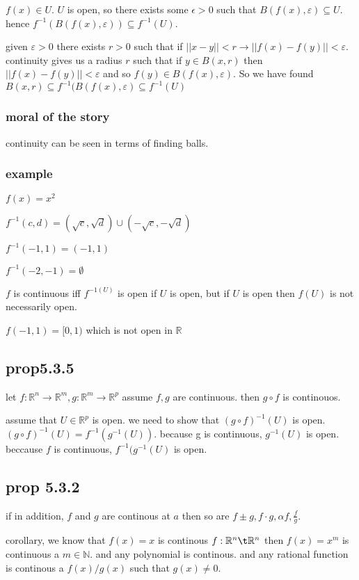 \documentclass[letterpaper]{article}
\begin{document}
$f(x)\in U$. $U$ is open, so there exists some $\epsilon>0$ such that $B(f(x),\varepsilon)\subseteq U$. hence $f^{-1}(B(f(x),\varepsilon))\subseteq f^{-1}(U)$.

given $\varepsilon>0$ there exists $r>0$ such that if $||x-y||<r\to ||f(x)-f(y)||<\varepsilon$. continuity gives us a radius $r$ such that if $y\in B(x,r)$ then $||f(x)-f(y)||<\varepsilon$ and so $f(y)\in B(f(x),\varepsilon)$. So we have found $B(x,r)\subseteq f^{-1}(B(f(x),\varepsilon)\subseteq f^{-1}(U)$

\subsubsection*{moral of the story}
continuity can be seen in terms of finding balls.

\subsubsection*{example}
$f(x)=x^2$

$f^{-1}(c,d)=(\sqrt{c},\sqrt{d})\cup (-\sqrt{c},-\sqrt{d})$

$f^{-1}(-1,1)=(-1,1)$

$f^{-1}(-2,-1)=\emptyset$

$f$ is continuous iff $f^{-1(U)}$ is open if $U$ is open, but if $U$ is open then $f(U)$ is not necessarily open.

$f(-1,1)=[0,1)$ which is not open in $\mathbb{R}$

\subsection*{prop5.3.5}
let $f:\mathbb{R}^n\to\mathbb{R}^m, g:\mathbb{R}^m\to\mathbb{R}^p$ assume $f,g$ are continuous. then $g\circ f$ is continouos.

assume that $U\in \mathbb{R}^p$ is open. we need to show that $(g\circ f)^{-1}(U)$ is open. $(g\circ f)^{-1}(U)=f^{-1}(g^{-1}(U))$. because g is continuous, $g^{-1}(U)$ is open. beccause $f$ is continuous, $f^{-1}(g^{-1}(U)$ is open.

\subsection*{prop 5.3.2}

if in addition, $f$ and $g$ are continous at $a$ then so are $f\pm g, f\cdot g, \alpha f,\frac{f}{g}$.

corollary, we know that $f(x)=x$ is continous $f:\mathbb{R}^n\t\mathbb{R}^n$ then $f(x)=x^{m}$ is continuous a $m\in \mathbb{N}$. and any  polynomial is continous. and any rational function  is continous a $f(x)/g(x)$ such that $g(x)\ne 0$.
\end{document}
